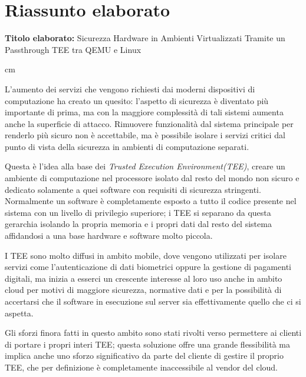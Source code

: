 \documentclass[12pt,italian]{report}
\begin{document}
\chapter*{Riassunto elaborato}


\textbf{Titolo elaborato:} Sicurezza Hardware in Ambienti Virtualizzati Tramite un Passthrough TEE tra QEMU e Linux

 cm

L'aumento dei servizi che vengono richiesti dai moderni dispositivi di
computazione ha creato un quesito: l'aspetto di sicurezza è diventato più
importante di prima, ma con la maggiore complessità di tali sistemi aumenta
anche la superficie di attacco.
Rimuovere funzionalità dal sistema principale per renderlo più sicuro non
è accettabile, ma è possibile isolare i servizi critici dal punto di vista
della sicurezza in ambienti di computazione separati.

Questa è l'idea alla base dei \textit{Trusted Execution Environment(TEE)},
creare un ambiente di computazione nel processore isolato dal resto del
mondo non sicuro e dedicato solamente a quei software con requisiti di
sicurezza stringenti.
Normalmente un software è completamente esposto a tutto il codice
presente nel sistema con un livello di privilegio superiore;
i TEE si separano da questa gerarchia isolando la propria memoria e i propri
dati dal resto del sistema affidandosi a una base hardware e software
molto piccola.

I TEE sono molto diffusi in ambito mobile, dove vengono utilizzati per
isolare servizi come l'autenticazione di dati biometrici oppure la gestione
di pagamenti digitali, ma inizia a esserci un crescente interesse al loro
uso anche in ambito cloud per motivi di maggiore sicurezza, normative dati e 
per la possibilità di accertarsi che il software in esecuzione sul server
sia effettivamente quello che ci si aspetta.

Gli sforzi finora fatti in questo ambito sono stati rivolti verso permettere
ai clienti di portare i propri interi TEE; questa soluzione offre una grande
flessibilità ma implica anche uno sforzo significativo da parte del cliente
di gestire il proprio TEE, che per definizione è completamente inaccessibile
al vendor del cloud.
\end{document}
